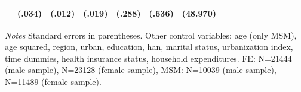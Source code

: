 \begin{table}[h]
\begin{adjustbox}{max width=\linewidth, center}
\begin{threeparttable}
{\begin{tabular}{l*{6}{S
S}}
                &   (.034)         &   (.012)         &   (.019)         &   (.288)         &   (.636)         & (48.970)         \\                                      
\bottomrule
\end{tabular}
\begin{tablenotes}
\item \textit{Notes}   Standard errors in parentheses.
Other control variables: age (only MSM), age squared, region, urban, education, han, marital status, urbanization index, time dummies, health insurance status, household expenditures. FE:  N=21444 (male sample), N=23128 (female sample), MSM: N=10039 (male sample), N=11489 (female sample).
\end{tablenotes}
}
\end{threeparttable}
\end{adjustbox}
\end{table}



